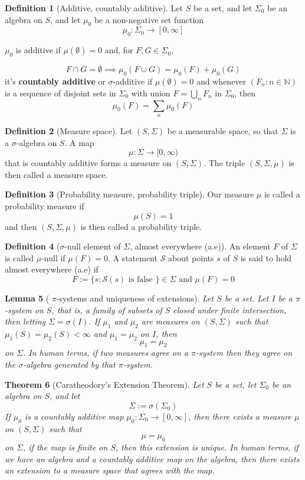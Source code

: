 \documentclass{tufte-handout}
\newtheorem{thm}{Theorem}
\newtheorem{lem}[thm]{Lemma}
\theoremstyle{definition}
\newtheorem{defn}[thm]{Definition}
\theoremstyle{remark}
\begin{document}
\begin{defn}[Additive, countably additive]
    Let $S$ be a set, and let $\Sigma_0$ be an algebra on $S$, and let $\mu_0$ be a non-negative set function 
    $$
        \mu_0 \colon \Sigma_0 \to [0,\infty]
    $$
    
    $\mu_0$ is additive if $\mu(\emptyset) = 0$ and, for $F,G \in \Sigma_0$, 

    $$
    F \cap G = \emptyset \implies \mu_0 (F \cup G) = \mu_0(F) + \mu_0(G)
    $$
    it's \textbf{countably additive} or $\sigma$-additive if $\mu(\emptyset) = 0 $ and whenever $(F_n \colon n \in \mathbb{N})$ is a sequence of disjoint sets in $\Sigma_0$ with union $F = \bigcup_{n} F_n$ in $\Sigma_0$, then
    $$ \mu_0(F) = \sum_{n} \mu_0(F)$$

    
\end{defn}

\begin{defn}[Measure space]
Let $(S, \Sigma)$ be a measurable space, so that $\Sigma$ is a $\sigma$-algebra on $S$. A map 
$$\mu \colon \Sigma \to [0,\infty)$$
that is countably additive forms a measure on $(S,\Sigma)$. The triple $(S, \Sigma, \mu)$ is then called a measure space. 
    
\end{defn}
\begin{defn}[Probability measure, probability triple]
    Our measure $\mu$ is called a probability measure if 
    $$\mu(S) = 1$$
    and then $(S, \Sigma, \mu)$ is then called a probability triple.
\end{defn}
\begin{defn}[$\sigma$-null element of $\Sigma$, almost everywhere (a.e)]
	An element $F$ of $\Sigma$ is called $\mu$-null if $\mu(F) = 0$. A statement $\mathcal{S}$ about points $s$ of $S$ is said to hold almost everywhere (a.e) if
	$$
		F := \{s \colon \mathcal{S}(s) \text{ is false }\} \in \Sigma \text { and } \mu(F) = 0
	$$
\end{defn}
\begin{lem}[ $\pi$-systems and uniqueness of extensions]
	Let $S$ be a set. Let $I$ be a $\pi$-system on $S$, that is, a family of subsets of $S$ closed under finite intersection,  then letting $\Sigma = \sigma(I)$. If $\mu_1$ and $\mu_2$ are measures on $(S, \Sigma)$ such that $\mu_1(S) = \mu_2(S) < \infty$ and $\mu_1 = \mu_2$ on $I$, then 
	$$\mu_1 = \mu_2$$ on $\Sigma$. In human terms, if two measures agree on a $\pi$-system then they agree on the $\sigma$-algebra generated by that $\pi$-system.
\end{lem}
\begin{thm}[Caratheodory's Extension Theorem]
	Let $S$ be a set, let $\Sigma_0$ be an algebra on $S$, and let 
	$$\Sigma := \sigma(\Sigma_0)$$
	If $\mu_0$ is a countably additive map $\mu_0 \colon \Sigma_0 \to [0,\infty]$, then there exists a measure $\mu$ on $(S,\Sigma)$ such that 
	$$\mu = \mu_0$$ on $\Sigma$, if the map is finite on $S$, then this extension is unique. In human terms, if we have an algebra and a countably additive map on the algebra, then there exists an extension to a measure space that agrees with the map. 
\end{thm}
\end{document}
